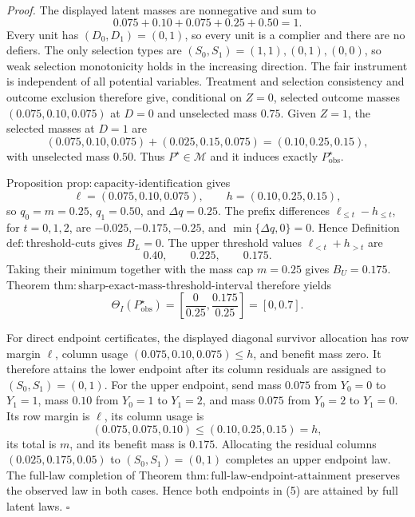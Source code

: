 \noindent\textit{Proof.}
The displayed latent masses are nonnegative and sum to
\[
0.075+0.10+0.075+0.25+0.50=1.
\tag{1}
\]
Every unit has \((D_0,D_1)=(0,1)\), so every unit is a complier and there
are no defiers.  The only selection types are
\((S_0,S_1)=(1,1),(0,1),(0,0)\), so weak selection monotonicity holds in
the increasing direction.  The fair instrument is independent of all
potential variables.  Treatment and selection consistency and outcome
exclusion therefore give, conditional on \(Z=0\), selected outcome masses
\((0.075,0.10,0.075)\) at \(D=0\) and unselected mass \(0.75\).  Given
\(Z=1\), the selected masses at \(D=1\) are
\[
(0.075,0.10,0.075)+(0.025,0.15,0.075)
=(0.10,0.25,0.15),
\tag{2}
\]
with unselected mass \(0.50\).  Thus \(P^{\star}\in\mathcal M\) and it
induces exactly \(P_{\mathrm{obs}}^{\star}\).

Proposition \(\mathrm{prop{:}capacity\text{-}identification}\) gives
\[
\ell=(0.075,0.10,0.075),\qquad
h=(0.10,0.25,0.15),
\tag{3}
\]
so \(q_0=m=0.25\), \(q_1=0.50\), and \(\Delta q=0.25\).  The prefix
differences \(\ell_{\le t}-h_{\le t}\), for \(t=0,1,2\), are
\(-0.025,-0.175,-0.25\), and \(\min\{\Delta q,0\}=0\).  Hence Definition
\(\mathrm{def{:}threshold\text{-}cuts}\) gives \(B_L=0\).  The upper
threshold values \(\ell_{<t}+h_{>t}\) are
\[
0.40,\qquad 0.225,\qquad 0.175.
\tag{4}
\]
Taking their minimum together with the mass cap \(m=0.25\) gives
\(B_U=0.175\).  Theorem
\(\mathrm{thm{:}sharp\text{-}exact\text{-}mass\text{-}threshold\text{-}interval}\)
therefore yields
\[
\Theta_I(P_{\mathrm{obs}}^{\star})
=\left[\frac{0}{0.25},\frac{0.175}{0.25}\right]=[0,0.7].
\tag{5}
\]

For direct endpoint certificates, the displayed diagonal survivor
allocation has row margin \(\ell\), column usage
\((0.075,0.10,0.075)\le h\), and benefit mass zero.  It therefore attains
the lower endpoint after its column residuals are assigned to
\((S_0,S_1)=(0,1)\).  For the upper endpoint, send mass \(0.075\) from
\(Y_0=0\) to \(Y_1=1\), mass \(0.10\) from \(Y_0=1\) to \(Y_1=2\), and
mass \(0.075\) from \(Y_0=2\) to \(Y_1=0\).  Its row margin is \(\ell\),
its column usage is
\[
(0.075,0.075,0.10)\le(0.10,0.25,0.15)=h,
\]
its total is \(m\), and its benefit mass is \(0.175\).  Allocating the
residual columns \((0.025,0.175,0.05)\) to
\((S_0,S_1)=(0,1)\) completes an upper endpoint law.  The full-law
completion of Theorem
\(\mathrm{thm{:}full\text{-}law\text{-}endpoint\text{-}attainment}\)
preserves the observed law in both cases.  Hence both endpoints in (5)
are attained by full latent laws. \(\square\)